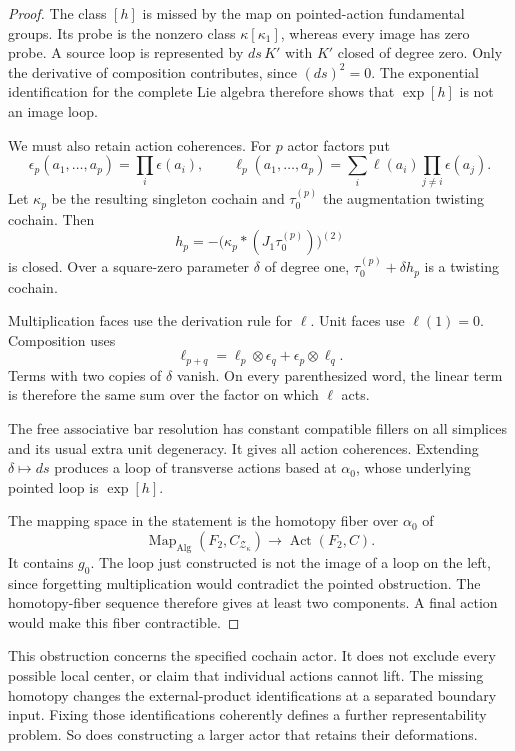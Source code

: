 \begin{proof}
The class $[h]$ is missed by the map on pointed-action
fundamental groups. Its probe is the nonzero class
$\kappa[\kappa_1]$, whereas every image has zero probe.
A source loop is represented by $ds\,K'$ with $K'$ closed
of degree zero. Only the derivative of composition contributes,
since $(ds)^2=0$. The exponential identification for the
complete Lie algebra therefore shows that $\exp[h]$
is not an image loop.

We must also retain action coherences. For $p$ actor factors put
\[
 \epsilon_p(a_1,\ldots,a_p)=\prod_i\epsilon(a_i),\qquad
 \ell_p(a_1,\ldots,a_p)
 =\sum_i\ell(a_i)\prod_{j\ne i}\epsilon(a_j).
\]
Let $\kappa_p$ be the resulting singleton cochain and
$\tau_0^{(p)}$ the augmentation twisting cochain.
Then
\[
 h_p=-\bigl(\kappa_p\ast(J_1\tau_0^{(p)})\bigr)^{(2)}
\]
is closed. Over a square-zero parameter $\delta$ of degree one,
$\tau_0^{(p)}+\delta h_p$ is a twisting cochain.

Multiplication faces use the derivation rule for $\ell$.
Unit faces use $\ell(1)=0$. Composition uses
\[
 \ell_{p+q}=\ell_p\otimes\epsilon_q+
            \epsilon_p\otimes\ell_q.
\]
Terms with two copies of $\delta$ vanish.
On every parenthesized word, the linear term is therefore
the same sum over the factor on which $\ell$ acts.

The free associative bar resolution has constant compatible
fillers on all simplices and its usual extra unit degeneracy.
It gives all action coherences. Extending $\delta\mapsto ds$
produces a loop of transverse actions based at $\alpha_0$,
whose underlying pointed loop is $\exp[h]$.

The mapping space in the statement is the homotopy fiber
over $\alpha_0$ of
\[
 \operatorname{Map}_{\mathrm{Alg}}
 (F_2,C_{\mathcal Z_\kappa})
 \longrightarrow
 \operatorname{Act}(F_2,C).
\]
It contains $g_0$. The loop just constructed is not the
image of a loop on the left, since forgetting multiplication
would contradict the pointed obstruction. The homotopy-fiber
sequence therefore gives at least two components.
A final action would make this fiber contractible.
\end{proof}

This obstruction concerns the specified cochain actor.
It does not exclude every possible local center, or claim
that individual actions cannot lift. The missing homotopy
changes the external-product identifications at a separated
boundary input. Fixing those identifications coherently
defines a further representability problem. So does
constructing a larger actor that retains their deformations.

